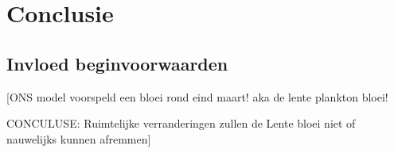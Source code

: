 \section{Conclusie}

\subsection{Invloed beginvoorwaarden}

[ONS model voorspeld een bloei rond eind maart! aka de lente plankton bloei!

CONCULUSE: Ruimtelijke verranderingen zullen de Lente bloei niet of nauwelijks kunnen afremmen]